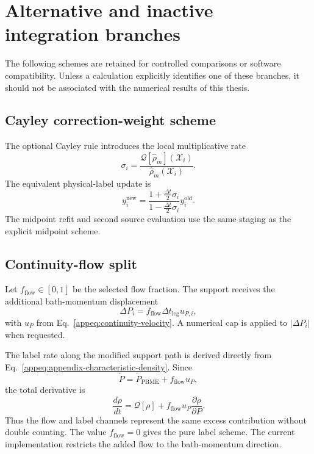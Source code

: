 \documentclass[
  11pt,
  letterpaper,
  onehalfspacing,
  normalmargins,
  equalmargins,
  oneside
]{ut-thesis}
\begin{document}
\section{Alternative and inactive integration branches}
\label{appsec:alternative-integrators}

The following schemes are retained for controlled comparisons or software
compatibility. Unless a calculation explicitly identifies one of these
branches, it should not be associated with the numerical results of this
thesis.

\subsection{Cayley correction-weight scheme}
\label{appsubsec:cayley-weight}

The optional Cayley rule introduces the local multiplicative rate
\begin{equation}
\sigma_i
=
\frac{
\mathcal Q[\widehat{\rho}_m]
(\boldsymbol{\mathcal X}_i)
}{
\widehat{\rho}_m(\boldsymbol{\mathcal X}_i)
}.
\label{appeq:cayley-local-rate}
\end{equation}
The equivalent physical-label update is
\begin{equation}
y_i^{\mathrm{new}}
=
\frac{
1+\frac{\Delta t}{2}\sigma_i
}{
1-\frac{\Delta t}{2}\sigma_i
}
y_i^{\mathrm{old}}.
\label{appeq:cayley-map}
\end{equation}
The midpoint refit and second source evaluation use the same staging as the
explicit midpoint scheme.

\subsection{Continuity-flow split}
\label{appsubsec:continuity-flow-split}

Let \(f_{\mathrm{flow}}\in[0,1]\) be the selected flow fraction.  The support
receives the additional bath-momentum displacement
\begin{equation}
\Delta P_i
=
f_{\mathrm{flow}}
\Delta t_{\mathrm{leg}}
u_{P,i},
\label{appeq:flow-displacement}
\end{equation}
with \(u_P\) from Eq.~\eqref{appeq:continuity-velocity}.  A numerical cap is
applied to \(|\Delta P_i|\) when requested.

The label rate along the modified support path is derived directly from
Eq.~\eqref{appeq:appendix-characteristic-density}.  Since
\[
\dot P
=
\dot P_{\mathrm{PBME}}
+
f_{\mathrm{flow}}u_P,
\]
the total derivative is
\begin{equation}
\frac{d\rho}{dt}
=
\mathcal Q[\rho]
+
f_{\mathrm{flow}}
u_P
\frac{\partial\rho}{\partial P}.
\label{appeq:flow-label-rate}
\end{equation}
Thus the flow and label channels represent the same excess contribution
without double counting.  The value \(f_{\mathrm{flow}}=0\) gives the pure
label scheme.  The current implementation restricts the added flow to the
bath-momentum direction.
\end{document}
